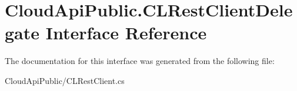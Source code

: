 \hypertarget{interface_cloud_api_public_1_1_c_l_rest_client_delegate}{\section{Cloud\-Api\-Public.\-C\-L\-Rest\-Client\-Delegate Interface Reference}
\label{interface_cloud_api_public_1_1_c_l_rest_client_delegate}
}


The documentation for this interface was generated from the following file\-:\begin{DoxyCompactItemize}
\item 
Cloud\-Api\-Public/C\-L\-Rest\-Client.\-cs\end{DoxyCompactItemize}
